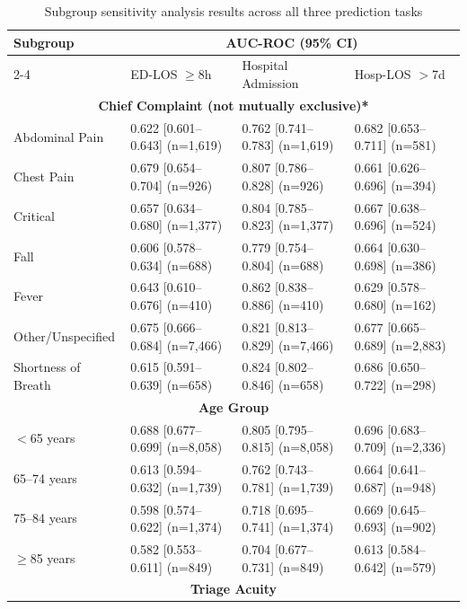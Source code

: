 \documentclass[harvard,article]{frontiersinFPHY_FAMS}
\begin{document}
\begin{table}[t]
\centering
\caption{Subgroup sensitivity analysis results across all three prediction tasks}
\label{tab:subgroup_analysis}
\small
\def\arraystretch{1.2}
\begin{tabularx}{\textwidth}{lXXX}
\toprule
\multirow{2}{*}{Subgroup} & \multicolumn{3}{c}{AUC-ROC (95\% CI)} \\
\cmidrule(lr){2-4}
& ED-LOS $\geq$8h & Hospital Admission & Hosp-LOS $>$7d \\
\midrule
\multicolumn{4}{c}{\textbf{Chief Complaint (not mutually exclusive)*}} \\
\midrule
Abdominal Pain      & 0.622 [0.601--0.643] (n=1,619) & 0.762 [0.741--0.783] (n=1,619) & 0.682 [0.653--0.711] (n=581) \\
Chest Pain          & 0.679 [0.654--0.704] (n=926)  & 0.807 [0.786--0.828] (n=926)  & 0.661 [0.626--0.696] (n=394) \\
Critical            & 0.657 [0.634--0.680] (n=1,377) & 0.804 [0.785--0.823] (n=1,377) & 0.667 [0.638--0.696] (n=524) \\
Fall                & 0.606 [0.578--0.634] (n=688)  & 0.779 [0.754--0.804] (n=688)  & 0.664 [0.630--0.698] (n=386) \\
Fever               & 0.643 [0.610--0.676] (n=410)  & 0.862 [0.838--0.886] (n=410)  & 0.629 [0.578--0.680] (n=162) \\
Other/Unspecified   & 0.675 [0.666--0.684] (n=7,466) & 0.821 [0.813--0.829] (n=7,466) & 0.677 [0.665--0.689] (n=2,883) \\
Shortness of Breath & 0.615 [0.591--0.639] (n=658)  & 0.824 [0.802--0.846] (n=658)  & 0.686 [0.650--0.722] (n=298) \\
\midrule
\multicolumn{4}{c}{\textbf{Age Group}} \\
\midrule
$<$65 years         & 0.688 [0.677--0.699] (n=8,058) & 0.805 [0.795--0.815] (n=8,058) & 0.696 [0.683--0.709] (n=2,336) \\
65--74 years        & 0.613 [0.594--0.632] (n=1,739) & 0.762 [0.743--0.781] (n=1,739) & 0.664 [0.641--0.687] (n=948) \\
75--84 years        & 0.598 [0.574--0.622] (n=1,374) & 0.718 [0.695--0.741] (n=1,374) & 0.669 [0.645--0.693] (n=902) \\
$\geq$85 years      & 0.582 [0.553--0.611] (n=849)  & 0.704 [0.677--0.731] (n=849)  & 0.613 [0.584--0.642] (n=579) \\
\midrule
\multicolumn{4}{c}{\textbf{Triage Acuity}} \\

\end{tabularx}
\end{table}
\end{document}
